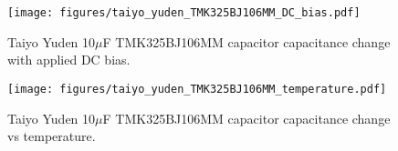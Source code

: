 \documentclass[10pt,twoside]{article}
\begin{document}
\begin{figure}[p]
  \begin{center}
    \texttt{[image: figures/taiyo\_yuden\_TMK325BJ106MM\_DC\_bias.pdf]}
  \end{center}
  \caption{Taiyo Yuden 10$\mu$F TMK325BJ106MM capacitor capacitance change with applied DC bias.}
  \label{fig:taiyo_yuden_DC_bias}
\end{figure}

\begin{figure}[p]
  \begin{center}
    \texttt{[image: figures/taiyo\_yuden\_TMK325BJ106MM\_temperature.pdf]}
  \end{center}
  \caption{Taiyo Yuden 10$\mu$F TMK325BJ106MM capacitor capacitance change vs temperature.}
  \label{fig:taiyo_yuden_temperature}
\end{figure}

\end{document}
